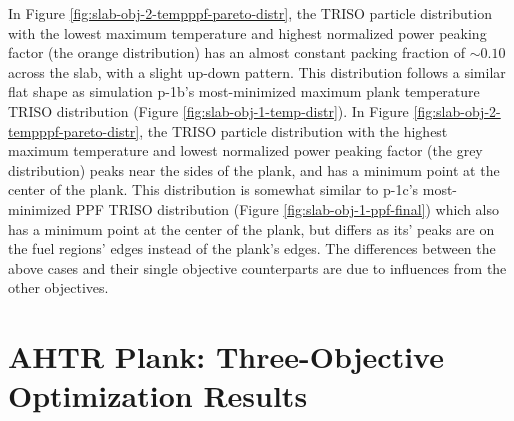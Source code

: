 In Figure \ref{fig:slab-obj-2-tempppf-pareto-distr}, the TRISO particle distribution with 
the lowest maximum temperature and highest normalized power peaking factor (the orange 
distribution) has an almost constant packing fraction of $\sim0.10$ across the slab, 
with a slight up-down pattern. 
This distribution follows a similar flat shape as simulation p-1b's most-minimized maximum 
plank temperature TRISO distribution (Figure \ref{fig:slab-obj-1-temp-distr}).
In Figure \ref{fig:slab-obj-2-tempppf-pareto-distr}, the TRISO particle distribution with 
the highest maximum temperature and lowest normalized power peaking factor (the grey 
distribution) peaks near the sides of the plank, and has a minimum point at the center
of the plank. 
This distribution is somewhat similar to p-1c's most-minimized PPF TRISO distribution 
(Figure \ref{fig:slab-obj-1-ppf-final})
which also has a minimum point at the center of the plank, but differs as its' peaks 
are on the fuel regions' edges instead of the plank's edges. 
The differences between the above cases and their single objective counterparts are due to 
influences from the other objectives. 

\section{AHTR Plank: Three-Objective Optimization Results}

